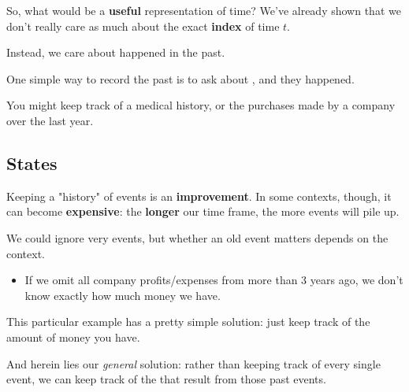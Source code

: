         So, what would be a \textbf{useful} representation of time? We've already shown that we don't really care as much about the exact \textbf{index} of time $t$.

        Instead, we care about  happened in the past.\\

        \begin{concept}
            One simple way to record the past is to ask about , and  they happened.
        \end{concept}

        \miniex You might keep track of a medical history, or the purchases made by a company over the last year.


    \subsection{States}

        Keeping a "history" of events is an \textbf{improvement}. In some contexts, though, it can become \textbf{expensive}: the \textbf{longer} our time frame, the more events will pile up.

        We could ignore very  events, but whether an old event matters depends on the context.

        \begin{itemize}
            \item \miniex If we omit all company profits/expenses from more than 3 years ago, we don't know exactly how much money we have.
        \end{itemize}

        This particular example has a pretty simple solution: just keep track of the  amount of money you have.

        And herein lies our \textit{general} solution: rather than keeping track of every single event, we can keep track of the  that result from those past events.\\

